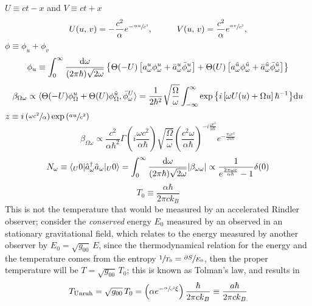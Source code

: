$U\equiv ct-x$ and $V\equiv ct+x$
\begin{subequations}
	\begin{gather}
		U(u,\,v)=-\frac{c^2}{\alpha}e^{-\sfrac{\alpha u}{c^2}},\hspace{1.0cm} V(u,\,v)=\frac{c^2}{\alpha}e^{\sfrac{\alpha v}{c^2}},
	\end{gather}
\end{subequations}
$\phi\equiv\phi_u+\phi_v$
\begin{equation}
	\phi_u\equiv\int_0^\infty \frac{\text{d} \omega}{(2\pi\hbar)\sqrt{2\omega}}\left\{\Theta(-U)\left[a^u_\omega\phi_\omega^u+\bar a^u_\omega\bar \phi_\omega^u \right]+\Theta(U)\left[a^{\tilde u}_\omega\phi_\omega^{\tilde u}+\bar a^{\tilde u}_\omega\bar \phi_\omega^{\tilde u} \right]\right\}
\end{equation}
\begin{equation}
	\beta_{\Omega\omega}\propto \langle \Theta(-U)\phi^u_\Omega+\Theta(U)\phi^{\tilde u}_\Omega,\bar\phi_\omega^{U}\rangle=\frac{1}{2\hbar^2}\sqrt{\frac{\Omega}{\omega}}\int_{-\infty}^\infty\exp{\left\{i\left[\omega U(u)+\Omega u\right]\hbar^{-1}\right\}}\text{d} u
\end{equation}
$z\equiv i\left(\sfrac{\omega c^2}{\alpha}\right)\exp{\left(\sfrac{a u}{c^2}\right)}$
\begin{equation}
	\beta_{\Omega\omega}\propto \frac{c^2}{\alpha\hbar^2}\Gamma\left(i\frac{\omega c^2}{\alpha\hbar }\right)\sqrt{\frac{\Omega}{\omega}}\left(\frac{c^2\omega}{\alpha\hbar }\right)^{-i\frac{\omega c^2}{\alpha\hbar}}e^{-\frac{\pi\omega c^2}{2\alpha\hbar}}
\end{equation}
\begin{equation}
	N_\omega\equiv\langle_U 0|\hat{a}_\omega^\dagger\hat{a}_\omega|_U0\rangle=\int_0^\infty\frac{\text{d}\omega}{(2\pi\hbar)\sqrt{2\omega}}|\beta_{\omega\omega}|\propto\frac{1}{e^{\frac{2\pi\omega c}{\alpha\hbar}}-1}\delta(0)
\end{equation}
\begin{equation}
	T_0\equiv \frac{\alpha\hbar}{2\pi ck_B}
\end{equation}
This is not the temperature that would be measured by an accelerated Rindler observer; consider the \textit{conserved} energy $E_0$ measured by an observed in an stationary gravitational field, which relates to the energy measured by another observer by $E_0=\sqrt{g_{00}}\,E$, since the thermodynamical relation for the energy and the temperature comes from the entropy $\sfrac{1}{T_0}=\sfrac{\partial S}{E_0}$, then the proper temperature will be $T=\sqrt{g_{00}}\,T_0$; this is known as Tolman's law, and results in
\begin{equation}
	T_{\text{Unruh}}=\sqrt{g_{00}}\,T_0=\left(\alpha e^{-\sfrac{\alpha}{c^2}\xi}\right)\frac{\hbar}{2\pi ck_B}\equiv \frac{a\hbar}{2\pi ck_B}
\end{equation}
